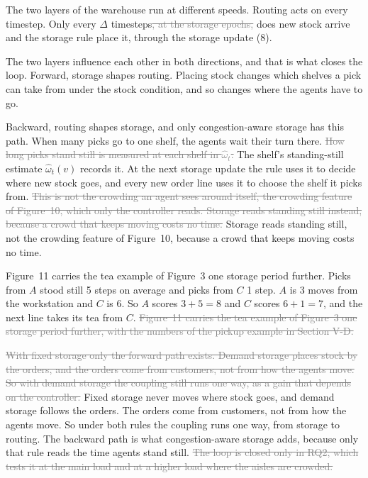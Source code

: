 \documentclass[11pt,a4paper]{article}
\newcommand{\new}[1]{\textcolor{newc}{#1}}
\newcommand{\old}[1]{\textcolor{gray}{\sout{#1}}}
\begin{document}
The two layers of the warehouse run at different speeds. Routing acts on
every timestep. Only every $\Delta$ timesteps\old{, at the storage epochs,}
does new stock arrive and the storage rule place it, through the storage
update (8).

The two layers influence each other in both directions, and that is what
closes the loop. Forward, storage shapes routing. Placing stock changes which
shelves a pick can take from under the stock condition, and so changes where
the agents have to go.

Backward, routing shapes storage\new{, and only congestion-aware storage has
this path}. When many picks go to one shelf, the agents wait their turn
there. \old{How long picks stand still is measured at each shelf in
$\hat\omega_t$.} \new{The shelf's standing-still estimate $\hat\omega_t(v)$
records it.} At the next storage update the rule uses it to decide where new
stock goes, and every new order line uses it to choose the shelf it picks
from. \old{This is not the crowding an agent sees around itself, the crowding
feature of Figure~10, which only the controller reads. Storage reads standing
still instead, because a crowd that keeps moving costs no time.} \new{Storage
reads standing still, not the crowding feature of Figure~10, because a crowd
that keeps moving costs no time.}

\new{Figure~11 carries the tea example of Figure~3 one storage period
further. Picks from $A$ stood still 5 steps on average and picks from $C$ 1
step. $A$ is 3 moves from the workstation and $C$ is 6. So $A$ scores
$3+5=8$ and $C$ scores $6+1=7$, and the next line takes its tea from $C$.}
\old{Figure~11 carries the tea example of Figure~3 one storage period further,
with the numbers of the pickup example in Section V-D.}

\old{With fixed storage only the forward path exists. Demand storage places
stock by the orders, and the orders come from customers, not from how the
agents move. So with demand storage the coupling still runs one way, as a
gain that depends on the controller.}
\new{Fixed storage never moves where stock goes, and demand storage follows
the orders. The orders come from customers, not from how the agents move. So
under both rules the coupling runs one way, from storage to routing.} The
backward path is what congestion-aware storage adds, because only that rule
reads the time agents stand still. \old{The loop is closed only in RQ2, which
tests it at the main load and at a higher load where the aisles are
crowded.}
\end{document}
